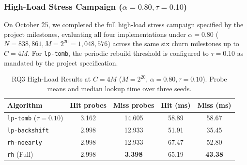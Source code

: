 \documentclass[conference]{IEEEtran}
\begin{document}
\subsubsection{High-Load Stress Campaign ($\alpha = 0.80, \tau = 0.10$)}
On October 25, we completed the full high-load stress campaign specified by the project milestones, evaluating all four implementations under $\alpha = 0.80$ ($N = 838,861, M = 2^{20} = 1,048,576$) across the same six churn milestones up to $C = 4M$. For \texttt{lp-tomb}, the periodic rebuild threshold is configured to $\tau = 0.10$ as mandated by the project specification.

\begin{table}[htbp]
\caption{RQ3 High-Load Results at $C=4M$ ($M=2^{20}$, $\alpha=0.80, \tau=0.10$). Probe means and median lookup time over three seeds.}
\label{tab:rq3_highload_results}
\centering
\begin{tabular}{|l|c|c|c|c|}
\hline
\textbf{Algorithm} & \textbf{Hit probes} & \textbf{Miss probes} & \textbf{Hit (ms)} & \textbf{Miss (ms)} \\
\hline
\texttt{lp-tomb} ($\tau=0.10$) & 3.162 & 14.605 & 58.89 & 58.67 \\
\texttt{lp-backshift} & 2.998 & 12.933 & 51.91 & 35.45 \\
\texttt{rh-noearly}   & 2.998 & 12.933 & 67.47 & 52.80 \\
\texttt{rh} (Full)    & 2.998 & \textbf{3.398} & 65.19 & \textbf{43.38} \\
\hline
\end{tabular}
\end{table}
\end{document}
